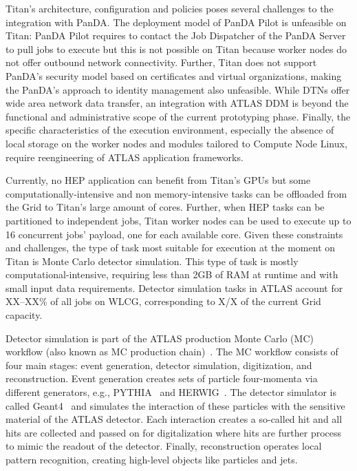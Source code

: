 
Titan's architecture, configuration and policies poses several challenges to the
integration with PanDA. The deployment model of PanDA Pilot is unfeasible on
Titan: PanDA Pilot requires to contact the Job Dispatcher of the PanDA Server to
pull jobs to execute but this is not possible on Titan because worker nodes do
not offer outbound network connectivity. Further, Titan does not support PanDA's
security model based on certificates and virtual organizations, making the
PanDA's approach to identity management also unfeasible. While DTNs offer wide
area network data transfer, an integration with ATLAS DDM is beyond the
functional and administrative scope of the current prototyping phase. Finally,
the specific characteristics of the execution environment, especially the
absence of local storage on the worker nodes and modules tailored to Compute
Node Linux, require reengineering of ATLAS application frameworks.

Currently, no HEP application can benefit from Titan's GPUs but some
computationally-intensive and non memory-intensive tasks can be offloaded from
the Grid to Titan's large amount of cores. Further, when HEP tasks can be
partitioned to independent jobs, Titan worker nodes can be used to execute up to
16 concurrent jobs' payload, one for each available core. Given these
constraints and challenges, the type of task most suitable for execution at the
moment on Titan is Monte Carlo
detector simulation.
This type of task is mostly computational-intensive, requiring less than 2GB of
RAM at runtime and with small input data requirements. Detector simulation tasks
in ATLAS account for XX--XX\% of all jobs on WLCG, corresponding to X/X of the
current Grid capacity.

Detector simulation is part of the ATLAS production Monte Carlo (MC) workflow
(also known as MC production
chain)~\cite{rimoldi2006atlas,de2013delphes,ritsch2014atlas}. The MC workflow
consists of four main stages: event generation, detector simulation,
digitization, and reconstruction. Event generation creates sets of particle
four-momenta via different generators, e.g., PYTHIA~\cite{sjostrand2006pythia}
and HERWIG~\cite{corcella2001herwig}. The detector simulator is called
Geant4~\cite{agostinelli2003geant4} and simulates the interaction of these
particles with the sensitive material of the ATLAS detector. Each interaction
creates a so-called hit and all hits are collected and passed on for
digitalization where hits are further process to mimic the readout of the
detector. Finally, reconstruction operates local pattern recognition, creating
high-level objects like particles and jets.

